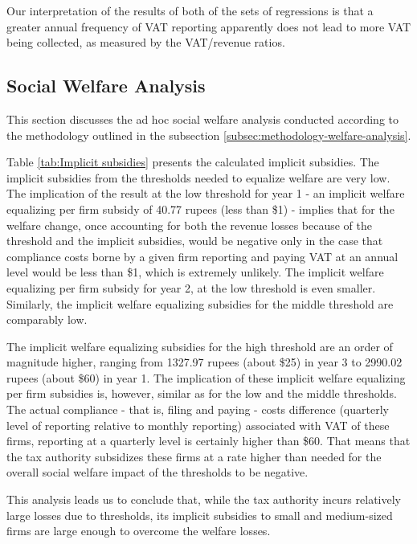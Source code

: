 Our interpretation of the results of both of the sets of regressions
is that a greater annual frequency of VAT reporting apparently does
not lead to more VAT being collected, as measured by the VAT/revenue
ratios.

\subsection{Social Welfare Analysis}
\label{subsec:results-social-welfare}

This section discusses the ad hoc social welfare analysis conducted according to the methodology outlined in the subsection \cref{subsec:methodology-welfare-analysis}. 

Table \ref{tab:Implicit subsidies} presents the calculated implicit subsidies. The implicit subsidies from the thresholds needed to equalize welfare are very low. The implication of the result at the low threshold for year 1 - an implicit welfare equalizing per firm subsidy of 40.77 rupees (less than \$1) - implies that for the welfare change, once accounting for both the revenue losses because of the threshold and the implicit subsidies, would be negative only in the case that compliance costs borne by a given firm reporting and paying VAT at an annual level would be less than \$1, which is extremely unlikely. The implicit welfare equalizing per firm subsidy for year 2, at the low threshold is even smaller. Similarly, the implicit welfare equalizing subsidies for the middle threshold are comparably low. 

The implicit welfare equalizing subsidies for the high threshold are an order of magnitude higher, ranging from 1327.97 rupees (about \$25) in year 3 to 2990.02 rupees (about \$60) in year 1. The implication of these implicit welfare equalizing per firm subsidies is, however, similar as for the low and the middle thresholds. The actual compliance - that is, filing and paying - costs difference (quarterly level of reporting relative to monthly reporting) associated with VAT of these firms, reporting at a quarterly level is certainly higher than \$60. That means that the tax authority subsidizes these firms at a rate higher than needed for the overall social welfare impact of the thresholds to be negative. 

This analysis leads us to conclude that, while the tax authority incurs relatively large losses due to thresholds, its implicit subsidies to small and medium-sized firms are large enough to overcome the welfare losses.

